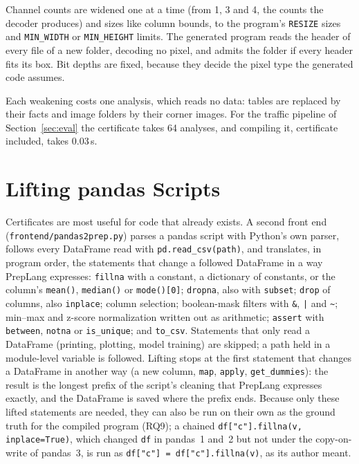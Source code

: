 \documentclass[conference]{IEEEtran}
\begin{document}
Channel counts are widened one at a time (from 1, 3 and 4, the counts the decoder produces) and
sizes like column bounds, to the program's \texttt{RESIZE} sizes and \texttt{MIN\_WIDTH} or
\texttt{MIN\_HEIGHT} limits. The generated program reads the header of every file of a new folder,
decoding no pixel, and admits the folder if every header fits its box. Bit depths are fixed, because
they decide the pixel type the generated code assumes.

Each weakening costs one analysis, which reads no data: tables are replaced by their facts and image
folders by their corner images. For the traffic pipeline of Section~\ref{sec:eval} the certificate
takes 64 analyses, and compiling it, certificate included, takes 0.03\,s.

\section{Lifting pandas Scripts}\label{sec:lift}

Certificates are most useful for code that already exists. A second front end
(\texttt{frontend/pandas2prep.py}) parses a pandas script with Python's own parser, follows every
DataFrame read with \texttt{pd.read\_csv(path)}, and translates, in program order, the statements
that change a followed DataFrame in a way PrepLang expresses: \texttt{fillna} with a constant, a
dictionary of constants, or the column's \texttt{mean()}, \texttt{median()} or \texttt{mode()[0]};
\texttt{dropna}, also with \texttt{subset}; \texttt{drop} of columns, also \texttt{inplace};
column selection; boolean-mask filters with \texttt{\&}, \texttt{|} and \texttt{\~}; min--max and
z-score normalization written out as arithmetic; \texttt{assert} with \texttt{between},
\texttt{notna} or \texttt{is\_unique}; and \texttt{to\_csv}. Statements that only read a DataFrame
(printing, plotting, model training) are skipped; a path held in a module-level variable is
followed. Lifting stops at the first statement that changes a DataFrame in another way (a new
column, \texttt{map}, \texttt{apply}, \texttt{get\_dummies}): the result is the longest prefix of
the script's cleaning that PrepLang expresses exactly, and the DataFrame is saved where the prefix
ends. Because only these lifted statements are needed, they can also be run on their own as the
ground truth for the compiled program (RQ9); a chained \texttt{df["c"].fillna(v, inplace=True)},
which changed \texttt{df} in pandas~1 and~2 but not under the copy-on-write of pandas~3, is run as
\texttt{df["c"] = df["c"].fillna(v)}, as its author meant.
\end{document}

